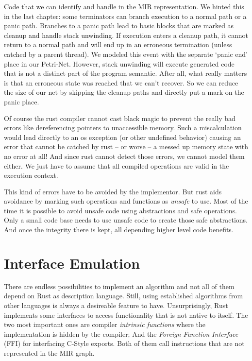 Code that we can identify and handle in the MIR representation.
We hinted this in the last chapter: some terminators can branch execution to a normal path or a panic path.
Branches to a panic path lead to basic blocks that are marked as cleanup and handle stack unwinding.
If execution enters a cleanup path, it cannot return to a normal path and will end up in an erroneous termination (unless catched by a parent thread).
We modeled this event with the separate `panic end' place in our Petri-Net.
However, stack unwinding will execute generated code that is not a distinct part of the program semantic.
After all, what really matters is that an erroneous state was reached that we can't recover.
So we can reduce the size of our net by skipping the cleanup paths and directly put a mark on the panic place.

Of course the rust compiler cannot cast black magic to prevent the really bad errors like dereferencing pointers to unaccessible memory.
Such a miscalculation would lead directly to an os exception (or other undefined behavior) causing an error that cannot be catched by rust -- or worse -- a messed up memory state with no error at all!
And since rust cannot detect those errors, we cannot model them either.
We just have to assume that all compiled operations are valid in the execution context.

This kind of errors have to be avoided by the implementor.
But rust aids avoidance by marking such operations and functions as \textit{unsafe} to use.
Most of the time it is possible to avoid unsafe code using abstractions and safe operations.
Only a small code base needs to use unsafe code to create those safe abstractions. 
And once the integrity there is kept, all depending higher level code benefits.


\section{Interface Emulation}
\label{emulation}
There are endless possibilities to implement an algorithm and not all of them depend on Rust as description language.
Still, using established algorithms from other languages is always a desireable feature to have.
Unsurprisingly, Rust implements some interfaces to access functionality that is not native to itself.
The two most important ones are compiler \textit{intrinsic functions} where the implementation is hidden by the compiler;
And the \textit{Foreign Function Interface} (FFI) for interfacing C-Style exports.
Both of them call instructions that are not represented in the MIR graph.

